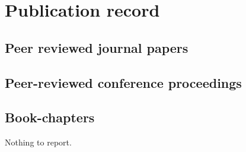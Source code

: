 \section{Publication record}
\subsection{Peer reviewed journal papers}
\subsection{Peer-reviewed conference proceedings}
\subsection{Book-chapters}
Nothing to report.